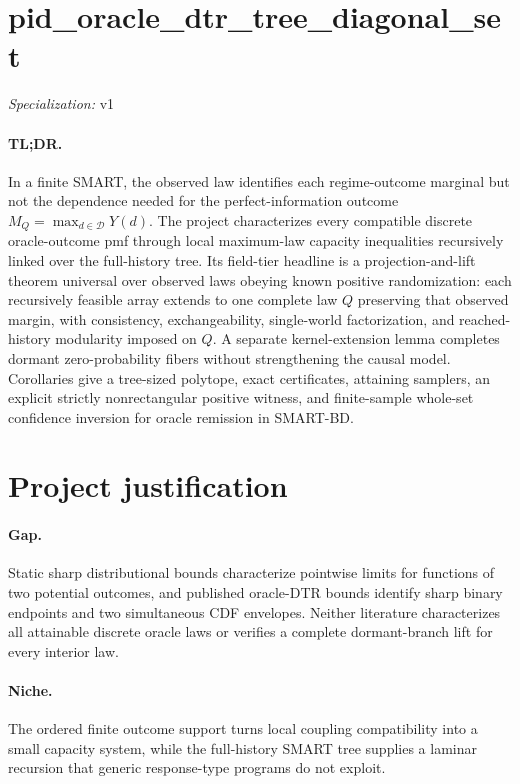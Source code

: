 \documentclass{article}
\begin{document}
\sloppy

\section*{pid\_\allowbreak{}oracle\_\allowbreak{}dtr\_\allowbreak{}tree\_\allowbreak{}diagonal\_\allowbreak{}set}

\noindent\textit{Specialization:} v1\par

\paragraph{TL;DR.} In a finite SMART, the observed law identifies each regime-outcome marginal but not the dependence needed for the perfect-information outcome \(M_Q=\max_{d\in\mathcal D}Y(d)\). The project characterizes every compatible discrete oracle-outcome pmf through local maximum-law capacity inequalities recursively linked over the full-history tree. Its field-tier headline is a projection-and-lift theorem universal over observed laws obeying known positive randomization: each recursively feasible array extends to one complete law \(Q\) preserving that observed margin, with consistency, exchangeability, single-world factorization, and reached-history modularity imposed on \(Q\). A separate kernel-extension lemma completes dormant zero-probability fibers without strengthening the causal model. Corollaries give a tree-sized polytope, exact certificates, attaining samplers, an explicit strictly nonrectangular positive witness, and finite-sample whole-set confidence inversion for oracle remission in SMART-BD.

\section{Project justification}

\paragraph{Gap.} Static sharp distributional bounds characterize pointwise limits for functions of two potential outcomes, and published oracle-DTR bounds identify sharp binary endpoints and two simultaneous CDF envelopes. Neither literature characterizes all attainable discrete oracle laws or verifies a complete dormant-branch lift for every interior law.

\paragraph{Niche.} The ordered finite outcome support turns local coupling compatibility into a small capacity system, while the full-history SMART tree supplies a laminar recursion that generic response-type programs do not exploit.
\end{document}
